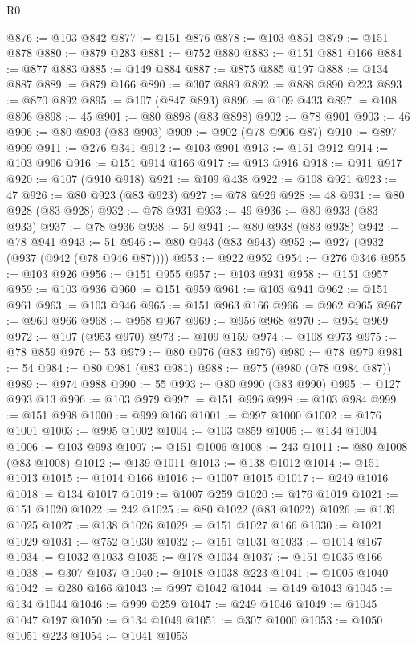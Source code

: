 \begin{lexlean}{R0}
\begin{coremodule}
@876 := @103 @842
@877 := @151 @876
@878 := @103 @851
@879 := @151 @878
@880 := @879 @283
@881 := @752 @880
@883 := @151 @881 @166
@884 := @877 @883
@885 := @149 @884
@887 := @875 @885 @197
@888 := @134 @887
@889 := @879 @166
@890 := @307 @889
@892 := @888 @890 @223
@893 := @870 @892
@895 := @107 (@847 @893)
@896 := @109 @433
@897 := @108 @896
@898 := 45
@901 := @80 @898 (@83 @898)
@902 := @78 @901
@903 := 46
@906 := @80 @903 (@83 @903)
@909 := @902 (@78 @906 @87)
@910 := @897 @909
@911 := @276 @341
@912 := @103 @901
@913 := @151 @912
@914 := @103 @906
@916 := @151 @914 @166
@917 := @913 @916
@918 := @911 @917
@920 := @107 (@910 @918)
@921 := @109 @438
@922 := @108 @921
@923 := 47
@926 := @80 @923 (@83 @923)
@927 := @78 @926
@928 := 48
@931 := @80 @928 (@83 @928)
@932 := @78 @931
@933 := 49
@936 := @80 @933 (@83 @933)
@937 := @78 @936
@938 := 50
@941 := @80 @938 (@83 @938)
@942 := @78 @941
@943 := 51
@946 := @80 @943 (@83 @943)
@952 := @927 (@932 (@937 (@942 (@78 @946 @87))))
@953 := @922 @952
@954 := @276 @346
@955 := @103 @926
@956 := @151 @955
@957 := @103 @931
@958 := @151 @957
@959 := @103 @936
@960 := @151 @959
@961 := @103 @941
@962 := @151 @961
@963 := @103 @946
@965 := @151 @963 @166
@966 := @962 @965
@967 := @960 @966
@968 := @958 @967
@969 := @956 @968
@970 := @954 @969
@972 := @107 (@953 @970)
@973 := @109 @159
@974 := @108 @973
@975 := @78 @859
@976 := 53
@979 := @80 @976 (@83 @976)
@980 := @78 @979
@981 := 54
@984 := @80 @981 (@83 @981)
@988 := @975 (@980 (@78 @984 @87))
@989 := @974 @988
@990 := 55
@993 := @80 @990 (@83 @990)
@995 := @127 @993 @13
@996 := @103 @979
@997 := @151 @996
@998 := @103 @984
@999 := @151 @998
@1000 := @999 @166
@1001 := @997 @1000
@1002 := @176 @1001
@1003 := @995 @1002
@1004 := @103 @859
@1005 := @134 @1004
@1006 := @103 @993
@1007 := @151 @1006
@1008 := 243
@1011 := @80 @1008 (@83 @1008)
@1012 := @139 @1011
@1013 := @138 @1012
@1014 := @151 @1013
@1015 := @1014 @166
@1016 := @1007 @1015
@1017 := @249 @1016
@1018 := @134 @1017
@1019 := @1007 @259
@1020 := @176 @1019
@1021 := @151 @1020
@1022 := 242
@1025 := @80 @1022 (@83 @1022)
@1026 := @139 @1025
@1027 := @138 @1026
@1029 := @151 @1027 @166
@1030 := @1021 @1029
@1031 := @752 @1030
@1032 := @151 @1031
@1033 := @1014 @167
@1034 := @1032 @1033
@1035 := @178 @1034
@1037 := @151 @1035 @166
@1038 := @307 @1037
@1040 := @1018 @1038 @223
@1041 := @1005 @1040
@1042 := @280 @166
@1043 := @997 @1042
@1044 := @149 @1043
@1045 := @134 @1044
@1046 := @999 @259
@1047 := @249 @1046
@1049 := @1045 @1047 @197
@1050 := @134 @1049
@1051 := @307 @1000
@1053 := @1050 @1051 @223
@1054 := @1041 @1053

\end{coremodule}
\end{lexlean}
